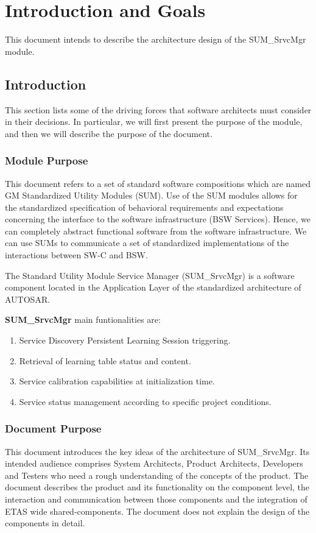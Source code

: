 \chapter{Introduction and Goals}
This document intends to describe the architecture design of the SUM\_SrvcMgr module.

\section{Introduction}
This section lists some of the driving forces that software architects must consider in their decisions. In particular, we will first present the purpose of the module, and then we will describe the purpose of the document.

\subsection{Module Purpose}

This document refers to a set of standard software compositions which are named GM Standardized Utility Modules (SUM).
Use of the SUM modules allows for the standardized specification of behavioral requirements and expectations concerning the interface to the software infrastructure (BSW Services).
Hence, we can completely abstract functional software from the software infrastructure.
We can use SUMs to communicate a set of standardized implementations of the interactions between SW-C and BSW.

The Standard Utility Module Service Manager (SUM\_SrvcMgr) is a software component located in the Application Layer of the standardized architecture of AUTOSAR.

\textbf{SUM\_SrvcMgr} main funtionalities are:
\begin{enumerate}
\item Service Discovery Persistent Learning Session triggering.
\item Retrieval of learning table status and content.
\item Service calibration capabilities at initialization time.
\item Service status management according to specific project conditions.  
\end{enumerate}


\subsection{Document Purpose}

This document introduces the key ideas of the architecture of SUM\_SrvcMgr.
Its intended audience comprises System Architects, Product Architects, Developers and Testers who need a rough understanding of the concepts of the product.
The document describes the product and its functionality on the component level, the interaction and communication between those components and the integration of ETAS wide shared-components.
The document does not explain the design of the components in detail.

